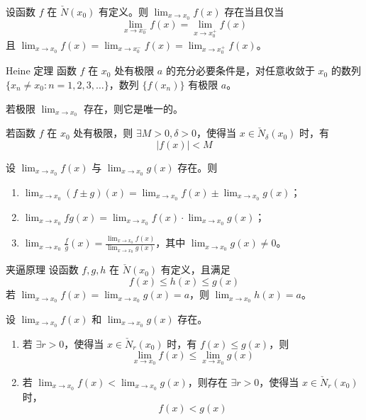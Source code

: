 \begin{theorem}
    设函数 $f$ 在 $\check{N}(x_0)$ 有定义。则 $\displaystyle \lim_{x \to x_0}f(x)$ 存在当且仅当
    \[\lim_{x \to x_{0}^{-}}f(x) = \lim_{x \to x_{0}^{+}}f(x)\]
    且 $\displaystyle \lim_{x \to x_0}f(x) = \lim_{x \to x_{0}^{-}}f(x) = \lim_{x \to x_{0}^{+}}f(x)$。
\end{theorem}

\begin{theorem}{Heine 定理}
    函数 $f$ 在 $x_0$ 处有极限 $a$ 的充分必要条件是，对任意收敛于 $x_0$ 的数列 $\{ x_n \neq x_0: n = 1,2,3, \ldots \}$，数列 $\{ f(x_n) \}$ 有极限 $a$。
\end{theorem}

\begin{theorem}
    若极限 $\displaystyle \lim_{x \to x_0}$ 存在，则它是唯一的。
\end{theorem}

\begin{theorem}
    若函数 $f$ 在 $x_0$ 处有极限，则 $\exists M > 0, \delta > 0$，使得当 $x \in \check{N}_{\delta}(x_0)$ 时，有
    \[|f(x)| < M\]
\end{theorem}

\begin{theorem}
    设 $\displaystyle \lim_{x \to x_0}f(x)$ 与 $\displaystyle \lim_{x \to x_0}g(x)$ 存在。则
    \begin{enumerate}[itemsep=0.5em]
        \item $\displaystyle \lim_{x \to x_0}(f \pm g)(x) = \lim_{x \to x_0}f(x) \pm \lim_{x \to x_0}g(x)$；
        \item $\displaystyle \lim_{x \to x_0}fg(x) = \lim_{x \to x_0}f(x) \cdot \lim_{x \to x_0}g(x)$；
        \item $\displaystyle \lim_{x \to x_0}\frac{f}{g}(x) = \frac{\displaystyle \lim_{x \to x_0}f(x)}{\displaystyle \lim_{x \to x_0}g(x)}$，其中 $\displaystyle \lim_{x \to x_0}g(x) \neq 0$。
    \end{enumerate}
\end{theorem}

\begin{theorem}{夹逼原理}
    设函数 $f, g, h$ 在 $\check{N}(x_0)$ 有定义，且满足
    \[f(x) \leqslant h(x) \leqslant g(x)\]
    若 $\displaystyle \lim_{x \to x_0}f(x) = \lim_{x \to x_0}g(x) = a$，则 $\displaystyle \lim_{x \to x_0}h(x) = a$。
\end{theorem}

\begin{theorem}
    设 $\displaystyle \lim_{x \to x_0}f(x)$ 和 $\displaystyle \lim_{x \to x_0}g(x)$ 存在。
    \begin{enumerate}
        \item 若 $\exists r > 0$，使得当 $x \in \check{N}_{r}(x_0)$ 时，有 $f(x) \leqslant g(x)$，则
              \[\lim_{x \to x_0}f(x) \leqslant \lim_{x \to x_0}g(x)\]
        \item 若 $\displaystyle \lim_{x \to x_0}f(x) < \lim_{x \to x_0}g(x)$，则存在 $\exists r > 0$，使得当 $x \in \check{N}_{r}(x_0)$ 时，
              \[f(x) < g(x)\]
    \end{enumerate}
\end{theorem}


